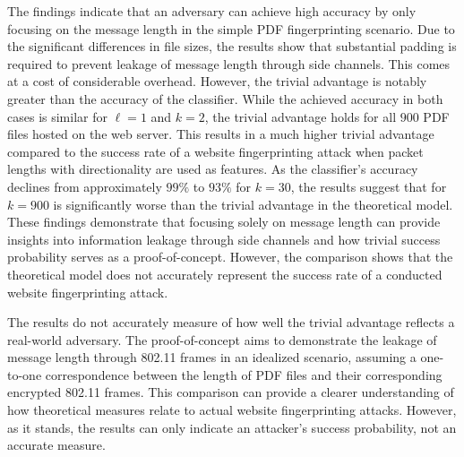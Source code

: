 The findings indicate that an adversary can achieve high accuracy by only focusing on the message length in the simple PDF fingerprinting scenario. Due to the significant differences in file sizes, the results show that substantial padding is required to prevent leakage of message length through side channels. This comes at a cost of considerable overhead. However, the trivial advantage is notably greater than the accuracy of the classifier. While the achieved accuracy in both cases is similar for $\ell=1$ and $k=2$, the trivial advantage holds for all $900$ PDF files hosted on the web server. This results in a much higher trivial advantage compared to the success rate of a website fingerprinting attack when packet lengths with directionality are used as features. As the classifier's accuracy declines from approximately $99\%$ to $93\%$ for $k=30$, the results suggest that for $k=900$ is significantly worse than the trivial advantage in the theoretical model. These findings demonstrate that focusing solely on message length can provide insights into information leakage through side channels and how trivial success probability serves as a proof-of-concept. However, the comparison shows that the theoretical model does not accurately represent the success rate of a conducted website fingerprinting attack.

The results do not accurately measure of how well the trivial advantage reflects a real-world adversary. The proof-of-concept aims to demonstrate the leakage of message length through 802.11 frames in an idealized scenario, assuming a one-to-one correspondence between the length of PDF files and their corresponding encrypted 802.11 frames. This comparison can provide a clearer understanding of how theoretical measures relate to actual website fingerprinting attacks. However, as it stands, the results can only indicate an attacker's success probability, not an accurate measure.

\clearpage